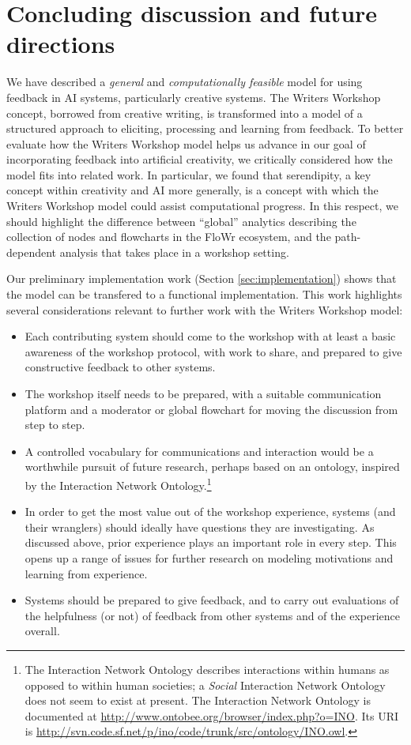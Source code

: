\section{Concluding discussion and future directions}

 We have described a \emph{general} and \emph{computationally
   feasible} model for using feedback in AI systems, particularly
 creative systems.  The Writers Workshop concept, borrowed from
 creative writing, is transformed into a model of a structured
 approach to eliciting, processing and learning from feedback.  To
 better evaluate how the Writers Workshop model helps us advance in
 our goal of incorporating feedback into artificial creativity, we
 critically considered how the model fits into related work. In
 particular, we found that serendipity, a key concept within
 creativity and AI more generally, is a concept with which the Writers
 Workshop model could assist computational progress.
In this respect, we should highlight the difference between
``global'' analytics describing the collection of nodes and
flowcharts in the FloWr ecosystem, and the path-dependent
analysis that takes place in a workshop setting.

Our preliminary implementation work (Section \ref{sec:implementation}) shows
that the model can be transfered to a functional implementation.  This
work highlights several considerations relevant to further work with
the Writers Workshop model:

\begin{itemize}
\item Each contributing system should come to the workshop with at
  least a basic awareness of the workshop protocol, with work to
  share, and prepared to give constructive feedback to other systems.
\item The workshop itself needs to be prepared, with a suitable
  communication platform and a moderator or global flowchart for
  moving the discussion from step to step.
 \item A controlled vocabulary for communications and interaction
   would be a worthwhile pursuit of future research, perhaps based on
   an ontology, inspired by the Interaction Network
   Ontology.\footnote{The Interaction Network Ontology describes
     interactions within humans as opposed to within human societies;
     a \emph{Social} Interaction Network Ontology does not seem to
     exist at present.  The Interaction Network Ontology is documented
     at \url{http://www.ontobee.org/browser/index.php?o=INO}.  Its URI
     is
     \url{http://svn.code.sf.net/p/ino/code/trunk/src/ontology/INO.owl}.}
\item In order to get the most value out of the workshop experience,
  systems (and their wranglers) should ideally have questions they are
  investigating.  As discussed above, prior experience plays an
  important role in every step.  This opens up a range of issues for
  further research on modeling motivations and learning from
  experience.
\item Systems should be prepared to give feedback, and to carry out
  evaluations of the helpfulness (or not) of feedback from other
  systems and of the experience overall.
\end{itemize}
  
